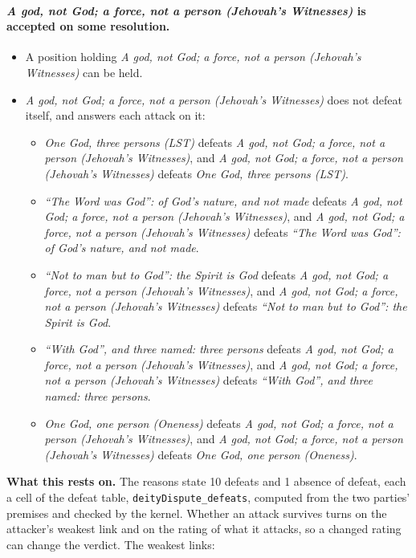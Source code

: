 \documentclass[11pt,paper=\testimonypaper,DIV=13,parskip=false]{scrartcl}
\begin{document}
\paragraph{\emph{A god, not God; a force, not a person (Jehovah’s Witnesses)} is accepted on some resolution.}
\begin{itemize}
\item A position holding \emph{A god, not God; a force, not a person (Jehovah’s Witnesses)} can be held.
\item \emph{A god, not God; a force, not a person (Jehovah’s Witnesses)} does not defeat itself, and answers each attack on it:
\begin{itemize}
\item \emph{One God, three persons (LST)} defeats \emph{A god, not God; a force, not a person (Jehovah’s Witnesses)}, and \emph{A god, not God; a force, not a person (Jehovah’s Witnesses)} defeats \emph{One God, three persons (LST)}.
\item \emph{“The Word was God”: of God’s nature, and not made} defeats \emph{A god, not God; a force, not a person (Jehovah’s Witnesses)}, and \emph{A god, not God; a force, not a person (Jehovah’s Witnesses)} defeats \emph{“The Word was God”: of God’s nature, and not made}.
\item \emph{“Not to man but to God”: the Spirit is God} defeats \emph{A god, not God; a force, not a person (Jehovah’s Witnesses)}, and \emph{A god, not God; a force, not a person (Jehovah’s Witnesses)} defeats \emph{“Not to man but to God”: the Spirit is God}.
\item \emph{“With God”, and three named: three persons} defeats \emph{A god, not God; a force, not a person (Jehovah’s Witnesses)}, and \emph{A god, not God; a force, not a person (Jehovah’s Witnesses)} defeats \emph{“With God”, and three named: three persons}.
\item \emph{One God, one person (Oneness)} defeats \emph{A god, not God; a force, not a person (Jehovah’s Witnesses)}, and \emph{A god, not God; a force, not a person (Jehovah’s Witnesses)} defeats \emph{One God, one person (Oneness)}.
\end{itemize}
\end{itemize}
\par\noindent\textbf{What this rests on.} The reasons state 10 defeats and 1 absence of defeat, each a cell of the defeat table, \texttt{deity\allowbreak{}Dispute\_\allowbreak{}defeats}, computed from the two parties' premises and checked by the kernel. Whether an attack survives turns on the attacker's weakest link and on the rating of what it attacks, so a changed rating can change the verdict. The weakest links:
\end{document}
